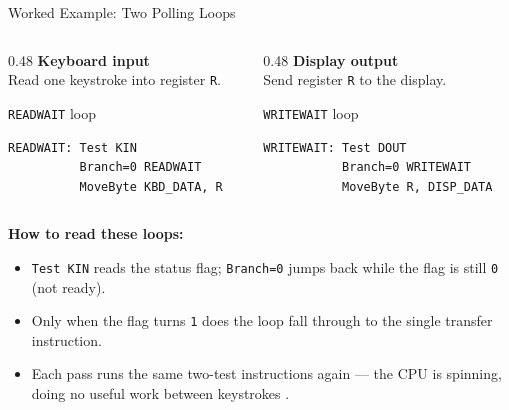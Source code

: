 \documentclass[aspectratio=169]{beamer}
\begin{document}
\begin{frame}[fragile]{Worked Example: Two Polling Loops}
  \begin{columns}[T]
    \begin{column}{0.48\textwidth}
      \centering \textbf{Keyboard input}\\[0.15cm]
      \footnotesize Read one keystroke into register \texttt{R}.
      \begin{block}{\texttt{READWAIT} loop}
        \footnotesize
        \begin{verbatim}
READWAIT: Test KIN
          Branch=0 READWAIT
          MoveByte KBD_DATA, R
        \end{verbatim}
      \end{block}
    \end{column}
    \begin{column}{0.48\textwidth}
      \centering \textbf{Display output}\\[0.15cm]
      \footnotesize Send register \texttt{R} to the display.
      \begin{block}{\texttt{WRITEWAIT} loop}
        \footnotesize
        \begin{verbatim}
WRITEWAIT: Test DOUT
           Branch=0 WRITEWAIT
           MoveByte R, DISP_DATA
        \end{verbatim}
      \end{block}
    \end{column}
  \end{columns}
  \vspace{-0.05cm}
  \textbf{How to read these loops:}
  \begin{itemize}
    \item \texttt{Test KIN} reads the status flag; \texttt{Branch=0} jumps
      back while the flag is still \texttt{0} (not ready).
    \item Only when the flag turns \texttt{1} does the loop fall through to
      the single transfer instruction.
    \item Each pass runs the same two-test instructions again --- the CPU is
      spinning, doing no useful work between keystrokes
      \cite{Hamacher2002_computer_organization}.
  \end{itemize}
\end{frame}
\end{document}
